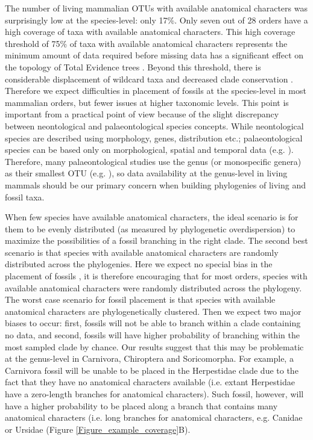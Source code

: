 \documentclass[12pt,letterpaper]{article}
\begin{document}
The number of living mammalian OTUs with available anatomical characters was surprisingly low at the species-level: only 17\%.
Only seven out of 28 orders have a high coverage of taxa with available anatomical characters.
This high coverage threshold of 75\% of taxa with available anatomical characters represents the minimum amount of data required before missing data has a significant effect on the topology of Total Evidence trees \cite{GuillermeCooper}.
Beyond this threshold, there is considerable displacement of wildcard taxa and decreased clade conservation \cite{GuillermeCooper}.
Therefore we expect difficulties in placement of fossils at the species-level in most mammalian orders, but fewer issues at higher taxonomic levels.
This point is important from a practical point of view because of the slight discrepancy between neontological and palaeontological species concepts.
While neontological species are described using morphology, genes, distribution etc.; palaeontological species can be based only on morphological, spatial and temporal data (e.g. \cite{ni2013oldest}).
Therefore, many palaeontological studies use the genus (or monospecific genera) as their smallest OTU (e.g. \cite{ni2013oldest,O'Leary08022013}), so data availability at the genus-level in living mammals should be our primary concern when building phylogenies of living and fossil taxa.

When few species have available anatomical characters, the ideal scenario is for them to be evenly distributed (as measured by phylogenetic overdispersion) to maximize the possibilities of a fossil branching in the right clade.
The second best scenario is that species with available anatomical characters are randomly distributed across the phylogenies. 
Here we expect no special bias in the placement of fossils \cite{GuillermeCooper}, it is therefore encouraging that for most orders, species with available anatomical characters were randomly distributed across the phylogeny.
The worst case scenario for fossil placement is that species with available anatomical characters are phylogenetically clustered. 
Then we expect two major biases to occur: first, fossils will not be able to branch within a clade containing no data, and second, fossils will have higher probability of branching within the most sampled clade by chance. 
Our results suggest that this may be problematic at the genus-level in Carnivora, Chiroptera and Soricomorpha. 
For example, a Carnivora fossil will be unable to be placed in the Herpestidae clade due to the fact that they have no anatomical characters available (i.e. extant Herpestidae have a zero-length branches for anatomical characters).
Such fossil, however, will have a higher probability to be placed along a branch that contains many anatomical characters (i.e. long branches for anatomical characters, e.g. Canidae or Ursidae (Figure \ref{Figure_example_coverage}B).
\end{document}
